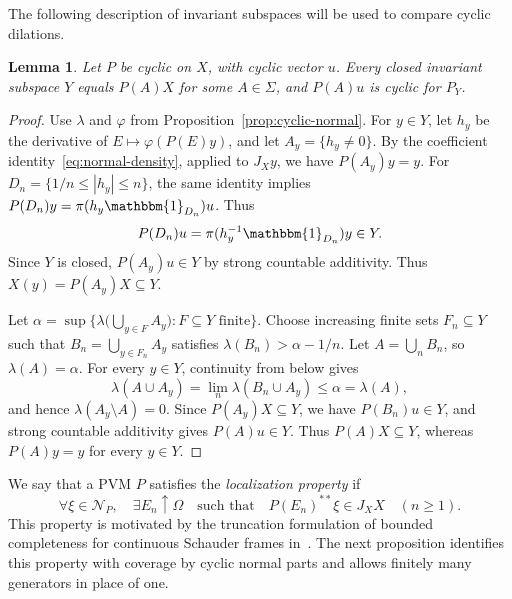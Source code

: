 \documentclass[11pt,leqno]{amsart}
\theoremstyle{compact}
\numberwithin{equation}{section}
\newtheorem{lemma}[theorem]{Lemma}
\theoremstyle{compactremark}
\theoremstyle{compact}
\newcommand{\1}{\mathbbm{1}}
\newcommand{\abs}[1]{\left|#1\right|}
\begin{document}
The following description of invariant subspaces will be used to compare cyclic dilations.

\begin{lemma}\label{lem:invariant-cyclic}
Let $P$ be cyclic on $X$, with cyclic vector $u$. Every closed invariant subspace $Y$ equals $P(A)X$ for some $A\in\Sigma$, and $P(A)u$ is cyclic for $P_Y$.
\end{lemma}

\begin{proof}
Use $\lambda$ and $\varphi$ from Proposition~\ref{prop:cyclic-normal}. For $y\in Y$, let $h_y$ be the derivative of $E\mapsto\varphi(P(E)y)$, and let $A_y=\{h_y\neq0\}$. By the coefficient identity~\eqref{eq:normal-density}, applied to $J_Xy$, we have $P(A_y)y=y$. For $D_n=\{1/n\leq\abs{h_y}\leq n\}$, the same identity implies $P(D_n)y=\pi(h_y\1_{D_n})u$. Thus
\[
P(D_n)u=\pi(h_y^{-1}\1_{D_n})y\in Y.
\]
Since $Y$ is closed, $P(A_y)u\in Y$ by strong countable additivity. Thus $X(y)=P(A_y)X\subseteq Y$.

Let $ \alpha=\sup\Big\{\lambda\Big(\bigcup_{y\in F}A_y\Big):F\subseteq Y\text{ finite}\Big\}$. Choose increasing finite sets $F_n\subseteq Y$ such that $B_n=\bigcup_{y\in F_n}A_y$ satisfies $\lambda(B_n)>\alpha-1/n$. Let $A=\bigcup_nB_n$, so $\lambda(A)=\alpha$. For every $y\in Y$, continuity from below gives
\[
\lambda(A\cup A_y)=\lim_n\lambda(B_n\cup A_y)\leq\alpha=\lambda(A),
\]
and hence $\lambda(A_y\setminus A)=0$. Since $P(A_y)X\subseteq Y$, we have $P(B_n)u\in Y$, and strong countable additivity gives $P(A)u\in Y$. Thus $P(A)X\subseteq Y$, whereas $P(A)y=y$ for every $y\in Y$.
\end{proof}

\begingroup
We say that a PVM $P$ satisfies the \emph{localization property} if
\begin{equation*}\tag{L}\label{eq:localization}
\forall\xi\in\mathcal N_P,\quad \exists E_n\uparrow\Omega\quad\text{such that}\quad P(E_n)^{**}\xi\in J_XX\quad(n\geq1).
\end{equation*}
This property is motivated by the truncation formulation of bounded completeness for continuous Schauder frames in~\cite[Definition~3.6]{EisnerFreeman2020}. The next proposition identifies this property with coverage by cyclic normal parts and allows finitely many generators in place of one.
\par\endgroup
\end{document}
